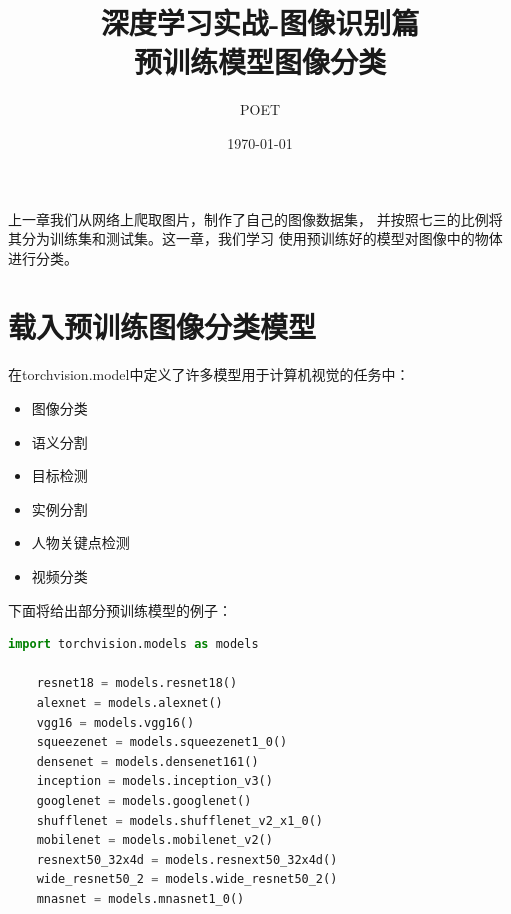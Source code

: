 \documentclass[12pt, a4paper, oneside]{ctexart} %
\title{深度学习实战-图像识别篇 \\ \large 预训练模型图像分类}
\author{POET}
\date{\today}
\begin{document}
\maketitle  %



\newpage

上一章我们从网络上爬取图片，制作了自己的图像数据集，
并按照七三的比例将其分为训练集和测试集。这一章，我们学习
使用预训练好的模型对图像中的物体进行分类。

\section{载入预训练图像分类模型}

在torchvision.model中定义了许多模型用于计算机视觉的任务中：

\begin{itemize}
    \item 图像分类
    \item 语义分割
    \item 目标检测
    \item 实例分割
    \item 人物关键点检测
    \item 视频分类
\end{itemize}

下面将给出部分预训练模型的例子：

\begin{lstlisting}[language=Python]
    import torchvision.models as models

    resnet18 = models.resnet18()
    alexnet = models.alexnet()
    vgg16 = models.vgg16()
    squeezenet = models.squeezenet1_0()
    densenet = models.densenet161()
    inception = models.inception_v3()
    googlenet = models.googlenet()
    shufflenet = models.shufflenet_v2_x1_0()
    mobilenet = models.mobilenet_v2()
    resnext50_32x4d = models.resnext50_32x4d()
    wide_resnet50_2 = models.wide_resnet50_2()
    mnasnet = models.mnasnet1_0()
\end{lstlisting}
\end{document}

